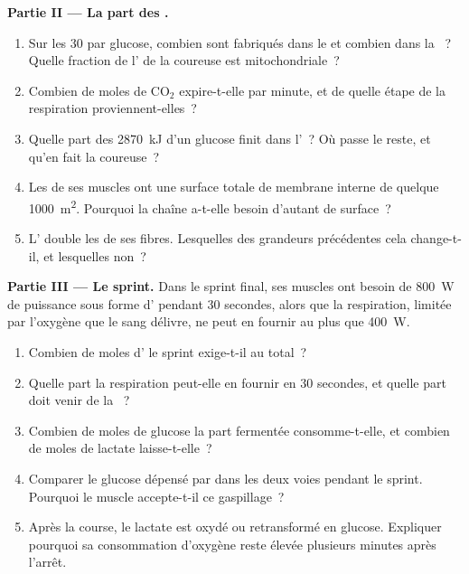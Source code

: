 \begin{problem}
\medskip
\noindent\textbf{Partie II --- La part des .}
\begin{enumerate}[resume]
  \item Sur les 30  par glucose, combien sont fabriqués dans le
         et combien dans la ~? Quelle fraction
        de l' de la coureuse est mitochondriale~?
  \item Combien de moles de $\mathrm{CO_2}$ expire-t-elle par minute,
        et de quelle étape de la respiration proviennent-elles~?
  \item Quelle part des \qty{2870}{kJ} d'un glucose finit dans l'~?
        Où passe le reste, et qu'en fait la coureuse~?
  \item Les  de ses muscles ont une surface totale de
        membrane interne de quelque \qty{1000}{m^2}. Pourquoi la
        chaîne a-t-elle besoin d'autant de surface~?
  \item L' double les  de ses fibres.
        Lesquelles des grandeurs précédentes cela change-t-il, et
        lesquelles non~?
\end{enumerate}

\medskip
\noindent\textbf{Partie III --- Le sprint.}
Dans le sprint final, ses muscles ont besoin de \qty{800}{W} de
puissance sous forme d' pendant 30 secondes, alors que la
respiration, limitée par l'oxygène que le sang délivre, ne peut en
fournir au plus que \qty{400}{W}.
\begin{enumerate}[resume]
  \item Combien de moles d' le sprint exige-t-il au total~?
  \item Quelle part la respiration peut-elle en fournir en 30
        secondes, et quelle part doit venir de la ~?
  \item Combien de moles de glucose la part fermentée
        consomme-t-elle, et combien de moles de lactate
        laisse-t-elle~?
  \item Comparer le glucose dépensé par  dans les deux voies
        pendant le sprint. Pourquoi le muscle accepte-t-il ce
        gaspillage~?
  \item Après la course, le lactate est oxydé ou retransformé en
        glucose. Expliquer pourquoi sa consommation d'oxygène reste
        élevée plusieurs minutes après l'arrêt.
\end{enumerate}


\end{problem}

